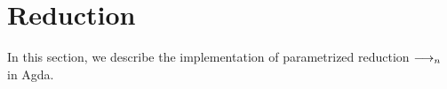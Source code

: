 \section{Reduction}
\label{sec:red}

In this section, we describe the implementation of parametrized
reduction $\longrightarrow_n$ in Agda.








